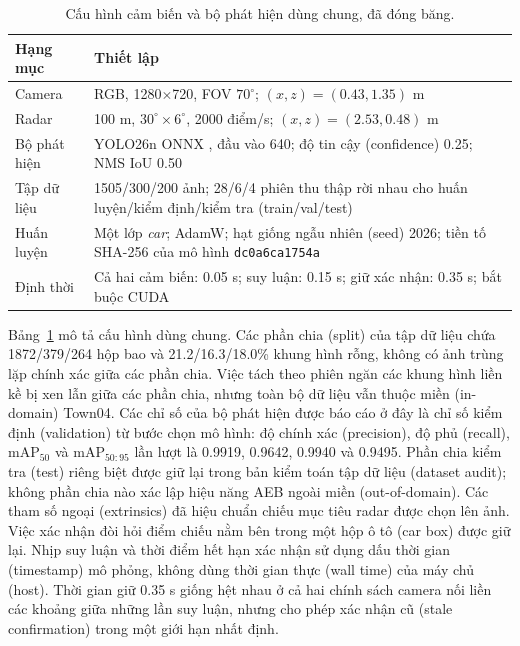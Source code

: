 \documentclass[11pt,a4paper]{article}
\begin{document}
\begin{table}[t]
\caption{Cấu hình cảm biến và bộ phát hiện dùng chung, đã đóng băng.}
\label{tab:setup}
\centering\small
\setlength{\tabcolsep}{4pt}
\begin{tabular}{p{}p{}}
\toprule Hạng mục & Thiết lập\\ \midrule
Camera & RGB, 1280$\times$720, FOV $70^\circ$; $(x,z)=(0.43,1.35)$ m\\
Radar & 100 m, $30^\circ\!\times6^\circ$, 2000 điểm/s; $(x,z)=(2.53,0.48)$ m\\
Bộ phát hiện & YOLO26n ONNX \cite{ultralytics_yolo}, đầu vào 640; độ tin cậy (confidence) 0.25; NMS IoU 0.50\\
Tập dữ liệu & 1505/300/200 ảnh; 28/6/4 phiên thu thập rời nhau cho huấn luyện/kiểm định/kiểm tra (train/val/test)\\
Huấn luyện & Một lớp \emph{car}; AdamW; hạt giống ngẫu nhiên (seed) 2026; tiền tố SHA-256 của mô hình \texttt{dc0a6ca1754a}\\
Định thời & Cả hai cảm biến: 0.05 s; suy luận: 0.15 s; giữ xác nhận: 0.35 s; bắt buộc CUDA\\
\bottomrule
\end{tabular}
\end{table}

Bảng~\ref{tab:setup} mô tả cấu hình dùng chung. Các phần chia (split) của tập
dữ liệu chứa 1872/379/264 hộp bao và 21.2/16.3/18.0\% khung hình rỗng, không
có ảnh trùng lặp chính xác giữa các phần chia. Việc tách theo phiên ngăn các
khung hình liền kề bị xen lẫn giữa các phần chia, nhưng toàn bộ dữ liệu vẫn
thuộc miền (in-domain) Town04. Các chỉ số của bộ phát hiện được báo cáo ở đây
là chỉ số kiểm định (validation) từ bước chọn mô hình: độ chính xác (precision),
độ phủ (recall), $\mathrm{mAP}_{50}$ và $\mathrm{mAP}_{50:95}$ lần lượt là 0.9919, 0.9642,
0.9940 và 0.9495. Phần chia kiểm tra (test) riêng biệt được giữ lại trong bản
kiểm toán tập dữ liệu (dataset audit); không phần chia nào xác lập hiệu năng
AEB ngoài miền (out-of-domain). Các tham số ngoại (extrinsics) đã hiệu chuẩn
chiếu mục tiêu radar được chọn lên ảnh. Việc xác nhận đòi hỏi điểm chiếu nằm
bên trong một hộp ô tô (car box) được giữ lại. Nhịp suy luận và thời điểm hết
hạn xác nhận sử dụng dấu thời gian (timestamp) mô phỏng, không dùng thời gian
thực (wall time) của máy chủ (host). Thời gian giữ 0.35 s giống hệt nhau ở cả
hai chính sách camera nối liền các khoảng giữa những lần suy luận, nhưng cho
phép xác nhận cũ (stale confirmation) trong một giới hạn nhất định.
\end{document}
